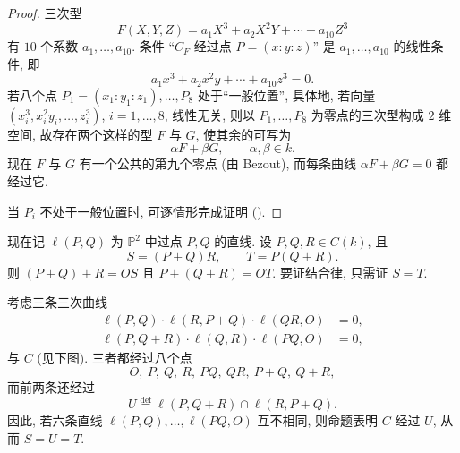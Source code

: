 \begin{proof}
三次型
\[
F(X,Y,Z) = a_1X^3 + a_2X^2Y + \cdots + a_{10}Z^3
\]
有 $10$ 个系数 $a_1,\dots,a_{10}$. 条件 ``$C_F$ 经过点 $P = (x:y:z)$'' 是 $a_1,\dots,a_{10}$ 的线性条件, 即
\[
a_1x^3 + a_2x^2y + \cdots + a_{10}z^3 = 0.
\]
若八个点 $P_1 = (x_1:y_1:z_1),\dots,P_8$ 处于``一般位置'', 具体地, 若向量 $(x_i^3, x_i^2y_i,\dots, z_i^3)$, $i = 1,\dots,8$, 线性无关, 则以 $P_1,\dots,P_8$ 为零点的三次型构成 $2$ 维空间, 故存在两个这样的型 $F$ 与 $G$, 使其余的可写为
\[
\alpha F + \beta G, \qquad \alpha,\beta\in k.
\]
现在 $F$ 与 $G$ 有一个公共的第九个零点 (由 Bezout), 而每条曲线 $\alpha F + \beta G = 0$ 都经过它.

当 $P_i$ 不处于一般位置时, 可逐情形完成证明 (\cite[III, 6.2]{walker1950}).
\end{proof}

现在记 $\ell(P,Q)$ 为 $\mathbb{P}^2$ 中过点 $P, Q$ 的直线. 设 $P,Q,R\in C(k)$, 且
\[
S = (P+Q)R, \qquad T = P(Q+R).
\]
则 $(P+Q)+R = OS$ 且 $P + (Q+R) = OT$. 要证结合律, 只需证 $S = T$.

考虑三条三次曲线
\begin{align*}
\ell(P,Q)\cdot\ell(R,P+Q)\cdot\ell(QR,O) &= 0,\\
\ell(P,Q+R)\cdot\ell(Q,R)\cdot\ell(PQ,O) &= 0,
\end{align*}
与 $C$ (见下图). 三者都经过八个点
\[
O,\ P,\ Q,\ R,\ PQ,\ QR,\ P+Q,\ Q+R,
\]
而前两条还经过
\[
U \overset{\text{def}}{=} \ell(P,Q+R)\cap\ell(R,P+Q).
\]
因此, 若六条直线 $\ell(P,Q),\dots,\ell(PQ,O)$ 互不相同, 则命题表明 $C$ 经过 $U$, 从而 $S = U = T$.

